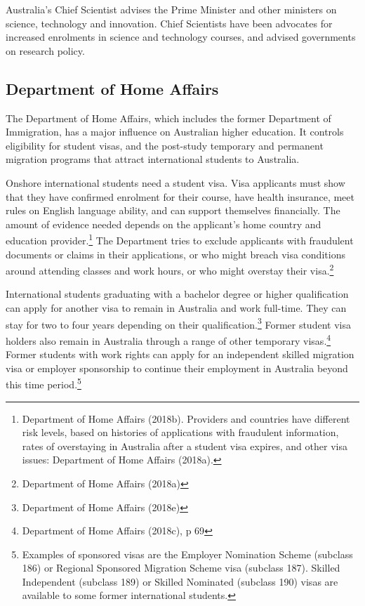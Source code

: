 \documentclass[]{book}
\begin{document}
Australia's Chief Scientist advises the Prime Minister and other ministers on science, technology and innovation. Chief Scientists have been advocates for increased enrolments in science and technology courses, and advised governments on research policy.

\hypertarget{department-of-home-affairs}{%
\subsection{Department of Home Affairs}\label{department-of-home-affairs}}

The Department of Home Affairs, which includes the former Department of Immigration, has a major influence on Australian higher education. It controls eligibility for student visas, and the post-study temporary and permanent migration programs that attract international students to Australia.

Onshore international students need a student visa. Visa applicants must show that they have confirmed enrolment for their course, have health insurance, meet rules on English language ability, and can support themselves financially. The amount of evidence needed depends on the applicant's home country and education provider.\footnote{Department of Home Affairs (2018b). Providers and countries have different risk levels, based on histories of applications with fraudulent information, rates of overstaying in Australia after a student visa expires, and other visa issues: Department of Home Affairs (2018a).} The Department tries to exclude applicants with fraudulent documents or claims in their applications, or who might breach visa conditions around attending classes and work hours, or who might overstay their visa.\footnote{Department of Home Affairs (2018a)}

International students graduating with a bachelor degree or higher qualification can apply for another visa to remain in Australia and work full-time. They can stay for two to four years depending on their qualification.\footnote{Department of Home Affairs (2018e)} Former student visa holders also remain in Australia through a range of other temporary visas.\footnote{Department of Home Affairs (2018c), p 69} Former students with work rights can apply for an independent skilled migration visa or employer sponsorship to continue their employment in Australia beyond this time period.\footnote{Examples of sponsored visas are the Employer Nomination Scheme (subclass 186) or Regional Sponsored Migration Scheme visa (subclass 187). Skilled Independent (subclass 189) or Skilled Nominated (subclass 190) visas are available to some former international students.}
\end{document}
